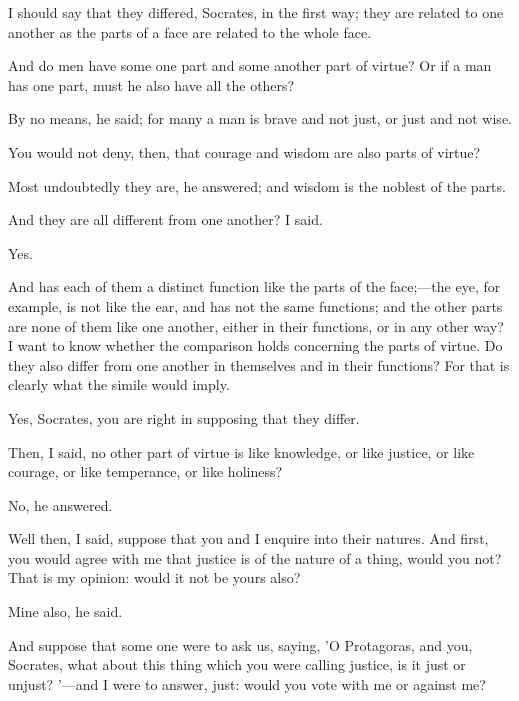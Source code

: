 \documentclass[11pt,letter]{article}
\begin{document}
\par  I should say that they differed, Socrates, in the first way; they are related to one another as the parts of a face are related to the whole face.

\par  And do men have some one part and some another part of virtue? Or if a man has one part, must he also have all the others?

\par  By no means, he said; for many a man is brave and not just, or just and not wise.

\par  You would not deny, then, that courage and wisdom are also parts of virtue?

\par  Most undoubtedly they are, he answered; and wisdom is the noblest of the parts.

\par  And they are all different from one another? I said.

\par  Yes.

\par  And has each of them a distinct function like the parts of the face;—the eye, for example, is not like the ear, and has not the same functions; and the other parts are none of them like one another, either in their functions, or in any other way? I want to know whether the comparison holds concerning the parts of virtue. Do they also differ from one another in themselves and in their functions? For that is clearly what the simile would imply.

\par  Yes, Socrates, you are right in supposing that they differ.

\par  Then, I said, no other part of virtue is like knowledge, or like justice, or like courage, or like temperance, or like holiness?

\par  No, he answered.

\par  Well then, I said, suppose that you and I enquire into their natures. And first, you would agree with me that justice is of the nature of a thing, would you not? That is my opinion: would it not be yours also?

\par  Mine also, he said.

\par  And suppose that some one were to ask us, saying, 'O Protagoras, and you, Socrates, what about this thing which you were calling justice, is it just or unjust? '—and I were to answer, just: would you vote with me or against me?
\end{document}
